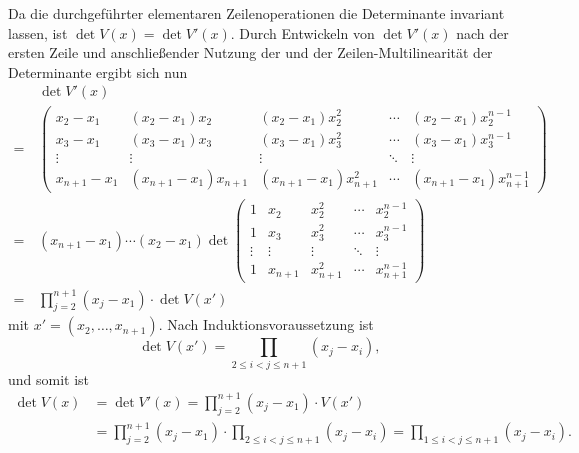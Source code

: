 \documentclass[a4paper,10pt]{article}
\begin{document}
Da die durchgeführter elementaren Zeilenoperationen die Determinante invariant lassen, ist $\det V(x) = \det V'(x)$. Durch Entwickeln von $\det V'(x)$ nach der ersten Zeile und anschließender Nutzung der und der Zeilen-Multilinearität der Determinante ergibt sich nun
\begin{align*}
  &\, \det V'(x) \\
 =&\,
 \begin{pmatrix}
   x_2 - x_1   & (x_2 - x_1)x_2       & (x_2 - x_1)x_2^2       & \cdots & (x_2 - x_1)x_2^{n-1}  \\
   x_3 - x_1   & (x_3 - x_1)x_3       & (x_3 - x_1)x_3^2       & \cdots & (x_3 - x_1)x_3^{n-1}  \\
   \vdots      & \vdots               & \vdots                 & \ddots & \vdots                \\
   x_{n+1}-x_1 & (x_{n+1}-x_1)x_{n+1} & (x_{n+1}-x_1)x_{n+1}^2 & \cdots & (x_{n+1}-x_1)x_{n+1}^{n-1}
  \end{pmatrix} \\
 =&\,
 (x_{n+1}-x_1) \dotsm (x_2-x_1) \det
 \begin{pmatrix}
   1      & x_2     & x_2^2     & \cdots & x_2^{n-1}     \\
   1      & x_3     & x_3^2     & \cdots & x_3^{n-1}     \\
   \vdots & \vdots  & \vdots    & \ddots & \vdots        \\
   1      & x_{n+1} & x_{n+1}^2 & \cdots & x_{n+1}^{n-1}
  \end{pmatrix} \\
 =&\,
 \prod_{j=2}^{n+1} (x_j - x_1) \cdot \det V(x')
\end{align*}
mit $x' = (x_2, \dotsc, x_{n+1})$. Nach Induktionsvoraussetzung ist
\[
 \det V(x') = \prod_{2 \leq i < j \leq n+1} (x_j - x_i),
\]
und somit ist
\begin{align*}
 \det V(x)
 &= \det V'(x)
 = \prod_{j=2}^{n+1} (x_j - x_1) \cdot V(x') \\
 &= \prod_{j=2}^{n+1} (x_j - x_1) \cdot \prod_{2 \leq i < j \leq n+1} (x_j - x_i)
 = \prod_{1 \leq i < j \leq n+1} (x_j - x_i).
\end{align*}
\end{document}
